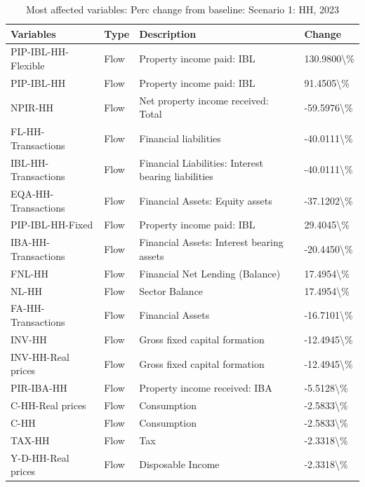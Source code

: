 \documentclass[
]{book}
\begin{document}
\begin{table}

\caption{\label{tab:most-affected-scenario-1-perc-2023-HH}Most affected variables: Perc change from baseline: Scenario 1: HH, 2023}
\centering
\fontsize{10}{12}\selectfont
\begin{tabular}[t]{l|l|l|l}
\hline
Variables & Type & Description & Change\\
\hline
PIP-IBL-HH-Flexible & Flow & Property income paid: IBL & 130.9800\textbackslash{}\%\\
\hline
PIP-IBL-HH & Flow & Property income paid: IBL & 91.4505\textbackslash{}\%\\
\hline
NPIR-HH & Flow & Net property income received: Total & -59.5976\textbackslash{}\%\\
\hline
FL-HH-Transactions & Flow & Financial liabilities & -40.0111\textbackslash{}\%\\
\hline
IBL-HH-Transactions & Flow & Financial Liabilities: Interest bearing liabilities & -40.0111\textbackslash{}\%\\
\hline
EQA-HH-Transactions & Flow & Financial Assets: Equity assets & -37.1202\textbackslash{}\%\\
\hline
PIP-IBL-HH-Fixed & Flow & Property income paid: IBL & 29.4045\textbackslash{}\%\\
\hline
IBA-HH-Transactions & Flow & Financial Assets: Interest bearing assets & -20.4450\textbackslash{}\%\\
\hline
FNL-HH & Flow & Financial Net Lending (Balance) & 17.4954\textbackslash{}\%\\
\hline
NL-HH & Flow & Sector Balance & 17.4954\textbackslash{}\%\\
\hline
FA-HH-Transactions & Flow & Financial Assets & -16.7101\textbackslash{}\%\\
\hline
INV-HH & Flow & Gross fixed capital formation & -12.4945\textbackslash{}\%\\
\hline
INV-HH-Real prices & Flow & Gross fixed capital formation & -12.4945\textbackslash{}\%\\
\hline
PIR-IBA-HH & Flow & Property income received: IBA & -5.5128\textbackslash{}\%\\
\hline
C-HH-Real prices & Flow & Consumption & -2.5833\textbackslash{}\%\\
\hline
C-HH & Flow & Consumption & -2.5833\textbackslash{}\%\\
\hline
TAX-HH & Flow & Tax & -2.3318\textbackslash{}\%\\
\hline
Y-D-HH-Real prices & Flow & Disposable Income & -2.3318\textbackslash{}\%\\

\end{tabular}
\end{table}
\end{document}

